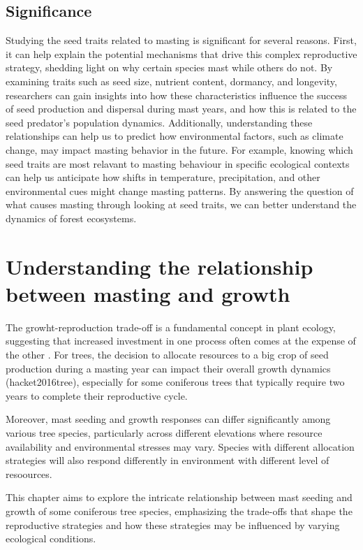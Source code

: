 \documentclass[11pt,letter]{article}
\begin{document}
\subsection{Significance} 
Studying the seed traits related to masting is significant for several reasons. First, it can help explain the potential mechanisms that drive this complex reproductive strategy, shedding light on why certain species mast while others do not. By examining traits such as seed size, nutrient content, dormancy, and longevity, researchers can gain insights into how these characteristics influence the success of seed production and dispersal during mast years, and how this is related to the seed predator's population dynamics.
Additionally, understanding these relationships can help us to predict how environmental factors, such as climate change, may impact masting behavior in the future. For example, knowing which seed traits are most relavant to masting behaviour in specific ecological contexts can help us anticipate how shifts in temperature, precipitation, and other environmental cues might change masting patterns. By answering the question of what causes masting through looking at seed traits, we can better understand the dynamics of forest ecosystems.

\section{Understanding the relationship between masting and growth}
The growht-reproduction trade-off is a fundamental concept in plant ecology, suggesting that increased investment in one process often comes at the expense of the other \citep{stearns1998evolution}. For trees, the decision to allocate resources to a big crop of seed production during a masting year can impact their overall growth dynamics (hacket2016tree), especially for some coniferous trees that typically require two years to complete their reproductive cycle.

Moreover, mast seeding and growth responses can differ significantly among various tree species, particularly across different elevations where resource availability and environmental stresses may vary. Species with different allocation strategies will also respond differently in environment with different level of resoources.

This chapter aims to explore the intricate relationship between mast seeding and growth of some coniferous tree species, emphasizing the trade-offs that shape the reproductive strategies and how these strategies may be influenced by varying ecological conditions.
\end{document}
